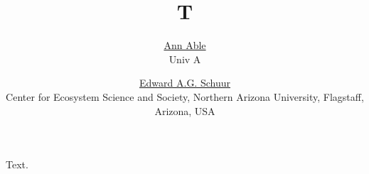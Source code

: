 \documentclass{article}
\title{T}
\author{\href{https://orcid.org/0000-0001}{\hspace{1mm}Ann Able} \\ Univ A \and \href{}{\hspace{1mm}Edward A.G. Schuur} \\ Center for Ecosystem Science and Society, Northern Arizona University, Flagstaff, Arizona, USA}
\begin{document}
\maketitle
Text.
\end{document}
